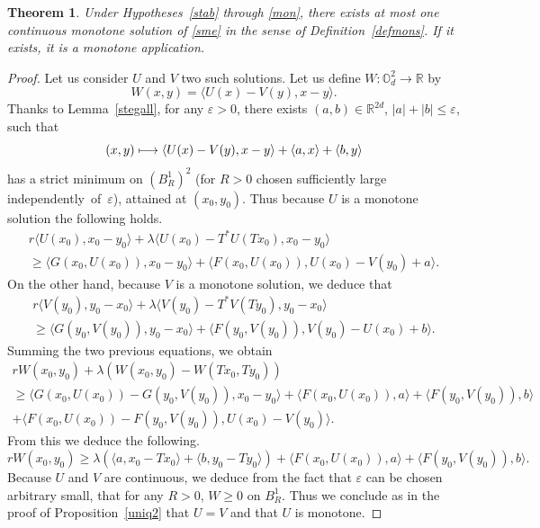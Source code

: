 \documentclass[10pt]{amsart}
\newcommand\mto{\mathchoice{\longmapsto}{\mapsto}{\mapsto}{\mapsto}}
\let\epsilon\varepsilon
\newtheorem{Theorem}{Theorem}[section]
\theoremstyle{definition}
\begin{document}
\begin{Theorem}\label{uniqstat}
Under Hypotheses~\ref{stab} through \ref{mon}, there exists at most one continuous monotone solution of \eqref{sme} in the sense of Definition~\ref{defmons}. If it exists, it is a monotone application.
\end{Theorem}
\begin{proof}
Let us consider $U$ and $V$ two such solutions. Let us define $W: \mathbb{O}_d^2 \to \mathbb{R}$ by
\begin{equation*}
W(x,y) = \langle U(x)-V(y), x-y \rangle.
\end{equation*}
Thanks to Lemma~\ref{stegall}, for any $\epsilon > 0$, there exists $(a,b)\in \mathbb{R}^{2d}$, $|a|+|b| \leq \epsilon$, such that
\[
(x,y) \mto \langle U(x)-V(y) , x-y \rangle+\langle a,x\rangle+\langle b, y\rangle
\]
has a strict minimum on $(B_R^1)^2$ (for $R\!>\!0$ chosen sufficiently large independently~of~$\epsilon$), attained at $(x_0,y_0)$. Thus because $U$ is a monotone solution the following holds.
\begin{multline*}
r\langle U(x_0), x_0-y_0\rangle+ \lambda\langle U(x_0)-T^*U(Tx_0), x_0-y_0\rangle \\
\geq
\langle G(x_0, U(x_0)), x_0-y_0\rangle+\langle F(x_0,U(x_0)), U(x_0)-V(y_0)+a\rangle.
\end{multline*}
On the other hand, because $V$ is a monotone solution, we deduce that
\begin{multline*}
r\langle V(y_0), y_0-x_0\rangle+ \lambda \langle V(y_0) -T^*V(Ty_0), y_0-x_0\rangle \\
\geq
\langle G(y_0, V(y_0)), y_0-x_0\rangle+\langle F(y_0,V(y_0)), V(y_0)-U(x_0)+b\rangle.
\end{multline*}
Summing the two previous equations, we obtain
\begin{multline*}
rW(x_0,y_0) + \lambda (W(x_0,y_0)-W(Tx_0,Ty_0))\\
\geq
 \langle G(x_0,U(x_0))-G(y_0,V(y_0)),x_0-y_0 \rangle+ \langle F(x_0,U(x_0)),a\rangle+\langle F(y_0,V(y_0)),b\rangle\\
+ \langle F(x_0,U(x_0))-F(y_0,V(y_0)),U(x_0)-V(y_0) \rangle.
\end{multline*}
From this we deduce the following.
\[
rW(x_0,y_0) \geq \lambda (\langle a, x_0-Tx_0\rangle+\langle b, y_0-Ty_0\rangle)+\langle F(x_0,U(x_0)),a\rangle+\langle F(y_0,V(y_0)),b\rangle.
\]
Because $U$ and $V$ are continuous, we deduce from the fact that $\epsilon$ can be chosen arbitrary small, that for any $R> 0$, $W \geq 0$ on $B^1_R$. Thus we conclude as in the proof of Proposition~\ref{uniq2} that $U = V$ and that $U$ is monotone.
\end{proof}
\end{document}
